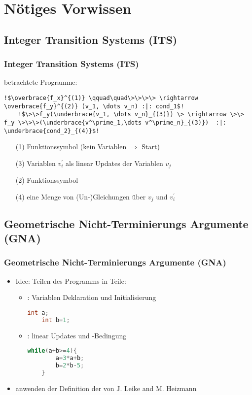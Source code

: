 \section{N{\"o}tiges Vorwissen}

\subsection{Integer Transition Systems (ITS) }
\frame{\tableofcontents[currentsection]}
\begin{frame}[fragile] %
	\frametitle{Integer Transition Systems (ITS)}
	\its betrachtete Programme:
	\begin{lstlisting}[escapechar=!]
	!$\overbrace{f_x}^{(1)} \qquad\quad\>\>\>\> \rightarrow \overbrace{f_y}^{(2)} (v_1, \dots v_n) :|: cond_1$!
	!$\>\>f_y(\underbrace{v_1, \dots v_n}_{(3)}) \> \rightarrow \>\> f_y \>\>\>(\underbrace{v^\prime_1,\dots v^\prime_n}_{(3)})  :|: \underbrace{cond_2}_{(4)}$!
	\end{lstlisting}
	
	\begin{enumerate}
		\item[(1)] Funktionssymbol (kein Variablen $\Rightarrow$ Start)
		\item[(3)] Variablen $v^\prime_i$ als linear Updates der Variablen $v_j$
		\item[(2)] Funktionssymbol
		\item[(4)] eine Menge von (Un-)Gleichungen \"uber $v_j$ und $v^\prime_i$
	\end{enumerate}

\end{frame}

\subsection{Geometrische Nicht-Terminierungs Argumente (GNA)}
\begin{frame}[fragile]
	\frametitle{Geometrische Nicht-Terminierungs Argumente (GNA)}
	\begin{itemize}
		\item Idee: Teilen des Programms in  Teile:
			\begin{itemize}
				\item \stem: Variablen Deklaration und Initialisierung
					\begin{lstlisting}[language = java]
	int a;
	int b=1;
					\end{lstlisting}
				\item \loopt: linear Updates und -Bedingung
				\begin{lstlisting}[language = java]
	while(a+b>=4){
		a=3*a+b;
		b=2*b-5;
	}
				\end{lstlisting}
			\end{itemize}
		\item anwenden der Definition der \gna von J. Leike and M. Heizmann 
	\end{itemize}
\end{frame}

